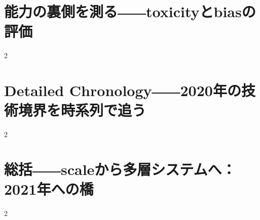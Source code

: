 \documentclass[lualatex,a4paper,11pt]{jlreq}
\begin{document}
\Needspace{0.45\textheight}
\bigskip
\section{能力の裏側を測る――toxicityとbiasの評価}
\label{pkg:evaluation-risk}
\vspace{0.15em}

\vspace{0.20em}
\begin{multicols}{2}

\end{multicols}

\medskip


\Needspace{0.45\textheight}
\bigskip
\section{Detailed Chronology――2020年の技術境界を時系列で追う}
\label{pkg:annual-chronology}
\vspace{0.15em}

\vspace{0.20em}
\begin{multicols}{2}

\end{multicols}
\medskip


\Needspace{0.45\textheight}
\bigskip
\section{総括――scaleから多層システムへ：2021年への橋}
\label{pkg:synthesis-transition-2021}
\vspace{0.15em}

\vspace{0.20em}
\begin{multicols}{2}

\end{multicols}
\medskip


\Needspace{0.30\textheight}
\bigskip
\printbibliography[title={References / Source Notes}]
\end{document}
